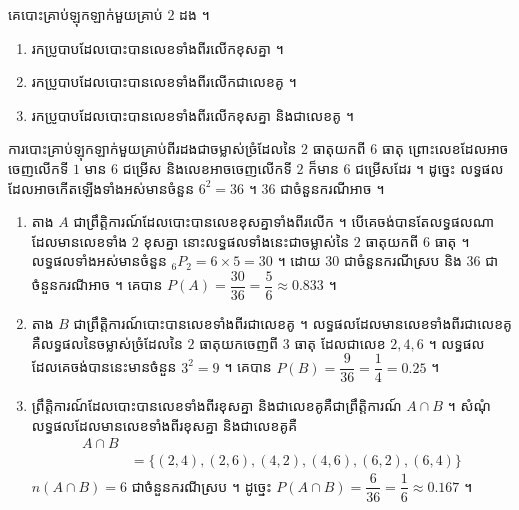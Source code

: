 \begin{example}[លំហាត់គំរូ ១]
គេបោះគ្រាប់ឡុកឡាក់មួយគ្រាប់ $2$ ដង ។
\begin{enumerate}[a]
  \item រកប្រូបាបដែលបោះបានលេខទាំងពីរលើកខុសគ្នា ។
  \item រកប្រូបាបដែលបោះបានលេខទាំងពីរលើកជាលេខគូ ។
  \item រកប្រូបាបដែលបោះបានលេខទាំងពីរលើកខុសគ្នា និងជាលេខគូ ។
\end{enumerate}
\ans
ការបោះគ្រាប់ឡុកឡាក់មួយគ្រាប់ពីរដងជាចម្លាស់ច្រំដែលនៃ $2$ ធាតុយកពី $6$ ធាតុ ព្រោះលេខដែលអាចចេញលើកទី $1$ មាន $6$ ជម្រើស និងលេខអាចចេញលើកទី $2$ ក៏មាន $6$ ជម្រើសដែរ ។ ដូច្នេះ លទ្ធផលដែលអាចកើតឡើងទាំងអស់មានចំនួន $6^2 = 36$ ។ $36$ ជាចំនួនករណីអាច ។
\begin{enumerate}[a]
  \item តាង $A$ ជាព្រឹត្តិការណ៍ដែលបោះបានលេខខុសគ្នាទាំងពីរលើក ។ បើគេចង់បានតែលទ្ធផលណាដែលមានលេខទាំង $2$ ខុសគ្នា នោះលទ្ធផលទាំងនេះជាចម្លាស់នៃ $2$ ធាតុយកពី $6$ ធាតុ ។ លទ្ធផលទាំងអស់មានចំនួន ${}_6P_2 = 6\times 5 = 30$ ។ ដោយ $30$ ជាចំនួនករណីស្រប និង $36$ ជាចំនួនករណីអាច ។ គេបាន $P(A) = \dfrac{30}{36} = \dfrac{5}{6} \approx 0.833$ ។
  \item តាង $B$ ជាព្រឹត្តិការណ៍បោះបានលេខទាំងពីរជាលេខគូ ។ លទ្ធផលដែលមានលេខទាំងពីរជាលេខគូ គឺលទ្ធផលនៃចម្លាស់ច្រំដែលនៃ $2$ ធាតុយកចេញពី $3$ ធាតុ ដែលជាលេខ $2, 4, 6$ ។ លទ្ធផលដែលគេចង់បាននេះមានចំនួន $3^2 = 9$ ។ គេបាន $P(B) = \dfrac{9}{36} = \dfrac{1}{4} = 0.25$ ។
  \item ព្រឹត្តិការណ៍ដែលបោះបានលេខទាំងពីរខុសគ្នា និងជាលេខគូគឺជាព្រឹត្តិការណ៍ $A \cap B$ ។ សំណុំលទ្ធផលដែលមានលេខទាំងពីរខុសគ្នា និងជាលេខគូគឺ
  \[
\begin{aligned}
A \cap B &\\
&= \{(2, 4), (2, 6), (4, 2), (4, 6), (6, 2), (6, 4)\}
\end{aligned}
\]
  $n(A \cap B) = 6$ ជាចំនួនករណីស្រប ។ ដូច្នេះ $P(A \cap B) = \dfrac{6}{36} = \dfrac{1}{6} \approx 0.167$ ។
\end{enumerate}
\end{example}

